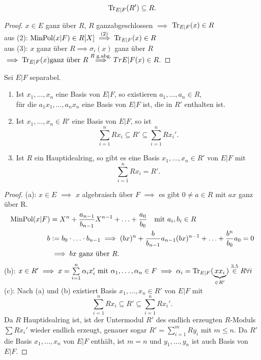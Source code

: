 \begin{lemma}
    $$ \operatorname{Tr}_{E|F} (R') \subseteq R.$$
\end{lemma}
\begin{proof}
    $x \in E$ ganz über $R$, $R$ ganzabgeschlossen $\implies$ $\operatorname{Tr}_{E|F}(x) \in R$\\
    aus (2): $\operatorname{MinPol}(x|F) \in R[X] \stackrel{(2)}{\implies} \operatorname{Tr}_{E|F}(x) \in R$\\
    aus (3): $x$ ganz über $R \implies \sigma_i(x)$ ganz über $R$
    $ \implies \operatorname{Tr}_{E|F}(x) \text{ganz über }R \stackrel{R \text{ g.abg.}}{\implies} Tr {E|F} (x) \in R.$
\end{proof}

\begin{lemma}
    Sei $E|F$ separabel.
    \begin{enumerate}[label=(\alph*)]
        \item Ist $x_1,\ldots,x_n$ eine Basis von $E|F$, so existieren $a_1, \ldots, a_n \in R$, \\für die 
        $a_1 x_1,\ldots, a_n x_n$ eine Basis von $E|F$ ist, die in $R'$ enthalten ist.

        \item Ist $x_1,\ldots,x_n \in R'$ eine Basis von $E|F$, so ist
        $$ \sum\limits_{i=1}^nRx_i \subseteq R' \subseteq \sum\limits_{i=1}^n Rx_i'.$$

        \item Ist $R$ ein Hauptidealring, so gibt es eine Basis $x_1,\ldots, x_n \in R'$ von $E|F$ mit 
        $$ \sum\limits_{i=1}^n Rx_i = R'.$$
    \end{enumerate}
\end{lemma}
\begin{proof}
    (a): $x \in E$ $\implies$ $x$ algebraisch über $F$ $\implies$ es gibt $0 \ne a \in R$ mit $ax$ ganz über R.
    \begin{align*}
        \operatorname{MinPol}(x|F) &= X^n + \frac{a_{n-1}}{b_{n-1}}X^{n-1} + \ldots + \frac{a_0}{b_0} \quad \text{mit } a_i,b_i \in R\\
        b &:= b_0 \cdot \ldots \cdot b_{n-1} \implies (bx)^n + \frac{b}{b_{n-1}}a_{n-1}(bx)^{n-1} + \ldots + \frac{b^n}{b_0}a_0 = 0\\
        &\implies bx \text{ ganz über }R.
    \end{align*}
    (b): $x \in R' \implies x = \sum\limits_{i=1}^n \alpha_i x_i' \text{ mit } \alpha_1, \ldots, \alpha_n \in F 
    \implies \alpha_i = \operatorname{Tr}_{E|F}(\underbrace{xx_i}_{\in R'}) \stackrel{3.5}{\in} R \forall i$\\
    (c): Nach (a) und (b) existiert Basis $x_1, \ldots, x_n \in R'$ von $E|F$ mit
    $$ \sum\limits_{i=1}^n Rx_i \subseteq R' \subseteq \sum\limits_{i=1}^n R x_i'.$$
    Da $R$ Hauptidealring ist, ist der Untermodul $R'$ des endlich erzeugten $R$-Moduls $\sum Rx_i'$ wieder endlich erzeugt, genauer
    sogar $R' = \sum\limits_{i=1}^m Ry_i$ mit $m \leq n$. Da $R'$ die Basis $x_1, \ldots, x_n$ von $E|F$ enthält, ist $m=n$ und $y_1, \ldots,y_n$
    ist auch Basis von $E|F$.
\end{proof}

